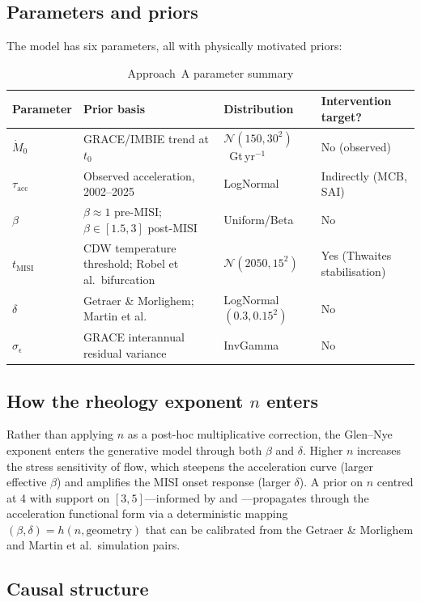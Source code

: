 \documentclass[11pt]{article}
\newcommand{\MISI}{\text{MISI}}
\begin{document}
\subsection{Parameters and priors}

The model has six parameters, all with physically motivated priors:

\begin{table}[h]
\centering
\caption{Approach~A parameter summary}
\label{tab:params_a}
\begin{tabular}{llll}
\toprule
Parameter & Prior basis & Distribution & Intervention target? \\
\midrule
$\dot{M}_0$ & GRACE/IMBIE trend at $t_0$ & $\mathcal{N}(150, 30^2)$~Gt\,yr$^{-1}$ & No (observed) \\
$\tau_{\text{acc}}$ & Observed acceleration, 2002--2025 & LogNormal & Indirectly (MCB, SAI) \\
$\beta$ & $\beta \approx 1$ pre-MISI; $\beta \in [1.5, 3]$ post-MISI & Uniform/Beta & No \\
$t_{\MISI}$ & CDW temperature threshold; Robel et al.\ bifurcation & $\mathcal{N}(2050, 15^2)$ & Yes (Thwaites stabilisation) \\
$\delta$ & Getraer \& Morlighem; Martin et al.\ & LogNormal$(0.3, 0.15^2)$ & No \\
$\sigma_\epsilon$ & GRACE interannual residual variance & InvGamma & No \\
\bottomrule
\end{tabular}
\end{table}

\subsection{How the rheology exponent $n$ enters}

Rather than applying $n$ as a post-hoc multiplicative correction, the Glen--Nye exponent enters the generative model through both $\beta$ and $\delta$.  Higher $n$ increases the stress sensitivity of flow, which steepens the acceleration curve (larger effective $\beta$) and amplifies the MISI onset response (larger $\delta$).  A prior on $n$ centred at 4 with support on $[3, 5]$---informed by \citet{millstein2022ice} and \citet{getraer2025increasing}---propagates through the acceleration functional form via a deterministic mapping $(\beta, \delta) = h(n, \text{geometry})$ that can be calibrated from the Getraer \& Morlighem and Martin et al.\ simulation pairs.

\subsection{Causal structure}
\end{document}
